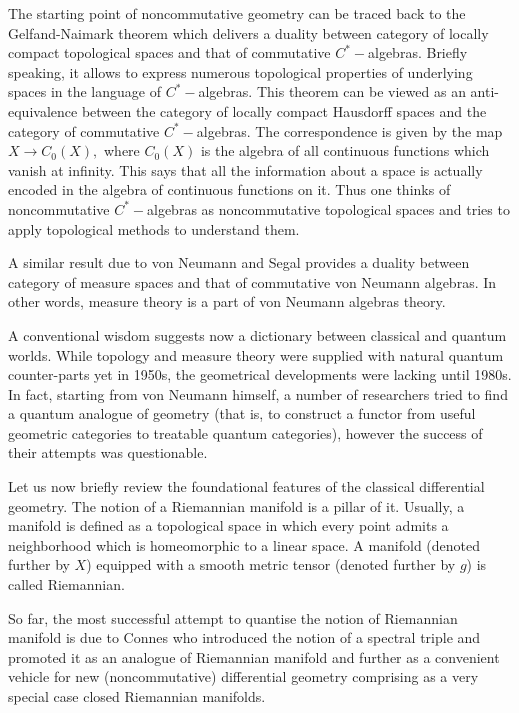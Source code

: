 \documentclass{article}
\begin{document}
The starting point of noncommutative geometry can be traced back to the Gelfand-Naimark theorem which delivers a duality between category of locally compact topological spaces and that of commutative $C^{\ast}-$algebras. Briefly speaking, it allows to express numerous topological properties of underlying spaces in the language of $C^{\ast}-$algebras. This   theorem can be viewed as an anti-equivalence between the category of locally compact Hausdorff spaces and the category of commutative $C^{\ast}-$algebras. The correspondence is given by the map $X\to C_0(X),$ where $C_0(X)$ is the algebra of all continuous functions which vanish at infinity. This says that all the information about a space is actually encoded in the algebra of continuous functions on it. Thus one thinks of noncommutative $C^{\ast}-$algebras as noncommutative topological spaces and tries to apply topological methods to understand them. 

A similar result due to von Neumann and Segal provides a duality between category of measure spaces and that of commutative von Neumann algebras. In other words, measure theory is a part of von Neumann algebras theory.

A conventional wisdom suggests now a dictionary between classical and quantum worlds.  While topology and measure theory were supplied with natural quantum counter-parts yet in 1950s, the geometrical developments were lacking until 1980s. In fact, starting from von Neumann himself, a number of researchers tried to find a quantum analogue of geometry (that is, to construct a functor from useful geometric categories to treatable quantum categories), however the success of their attempts was questionable.

Let us now briefly review the foundational features of the classical differential geometry. The notion of a Riemannian manifold is a pillar of it. Usually, a manifold is defined as a topological space in which every point admits a neighborhood which is homeomorphic to a linear space. A manifold (denoted further by $X$) equipped with a smooth metric tensor (denoted further by $g$) is called Riemannian.

So far, the most successful attempt to quantise the notion of Riemannian manifold is due to Connes who introduced the notion of a spectral triple and promoted it as an analogue of Riemannian manifold and further as a convenient vehicle for new (noncommutative) differential geometry comprising as a very special case closed Riemannian manifolds.  
\end{document}
